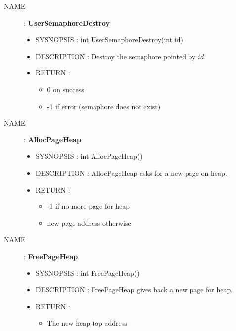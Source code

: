 \begin{description}
    \item [NAME] : \textbf{UserSemaphoreDestroy}
        \begin{itemize}
            \item SYSNOPSIS : int UserSemaphoreDestroy(int id)
            \item DESCRIPTION :
                Destroy the semaphore pointed by $id$.
            \item RETURN :
                \begin{itemize}
                    \item 0 on success
                    \item -1 if error (semaphore does not exist)
                \end{itemize}
        \end{itemize}

    \item [NAME] : \textbf{AllocPageHeap}
        \begin{itemize}
            \item SYSNOPSIS : int AllocPageHeap()
            \item DESCRIPTION :
                AllocPageHeap asks for a new page on heap.
            \item RETURN :
                \begin{itemize}
                    \item -1 if no more page for heap
                    \item new page address otherwise
                \end{itemize}
        \end{itemize}

    \item [NAME] : \textbf{FreePageHeap}
        \begin{itemize}
            \item SYSNOPSIS : int FreePageHeap()
            \item DESCRIPTION :
                FreePageHeap gives back a new page for heap.
            \item RETURN :
                \begin{itemize}
                    \item The new heap top address
                \end{itemize}
        \end{itemize}


\end{description}
